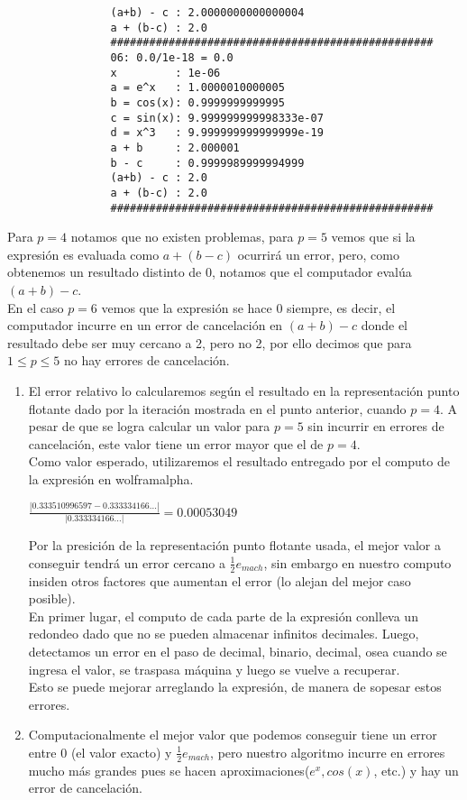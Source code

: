\documentclass[spanish, fleqn]{article}
\begin{document}
\begin{enumerate}
\begin{verbatim}
				(a+b) - c : 2.0000000000000004
				a + (b-c) : 2.0
				##################################################
				06: 0.0/1e-18 = 0.0
				x         : 1e-06
				a = e^x   : 1.0000010000005
				b = cos(x): 0.9999999999995
				c = sin(x): 9.999999999998333e-07
				d = x^3   : 9.999999999999999e-19
				a + b     : 2.000001
				b - c     : 0.9999989999994999
				(a+b) - c : 2.0
				a + (b-c) : 2.0
				##################################################
			\end{verbatim}
			Para $p=4$ notamos que no existen problemas, para $p=5$ vemos que
			si la expresión es evaluada como $a + (b - c)$ ocurrirá un error, 
			pero, como obtenemos un resultado distinto de 0, notamos que el
			computador evalúa $(a + b) - c$.\\
			En el caso $p=6$ vemos que la expresión se hace 0 siempre, es decir,
			el computador incurre en un error de cancelación en $(a+b)-c$ donde
			el resultado debe ser muy cercano a 2, pero no 2, por ello decimos
			que para $1 \leq p \leq 5$ no hay errores de cancelación. 

		\begin{enumerate}
			\item
				El error relativo lo calcularemos según el resultado en la
				representación punto flotante dado por la iteración mostrada en
				el punto anterior, cuando $p = 4$. A pesar de que se 
				logra calcular un valor para $p = 5$ sin incurrir en errores de
				cancelación, este valor tiene un error mayor que el de $p=4$.\\
				Como valor esperado, utilizaremos el resultado entregado por el 
				computo de la expresión en wolframalpha.
				\begin{center}
					$\frac{|0.333510996597 - 0.333334166...|}{|0.333334166...|}
					= 0.00053049$
				\end{center}
				Por la presición de la representación punto flotante usada, el 
				mejor valor a conseguir tendrá un error cercano a $\frac{1}{2} 
				e_{mach}$, sin embargo en nuestro computo insiden otros 
				factores que aumentan el error (lo alejan del mejor caso 
				posible).\\
				En primer lugar, el computo de cada parte de la expresión 
				conlleva un redondeo dado que no se pueden almacenar infinitos
				decimales. Luego, detectamos un error en el paso de decimal, 
				binario, decimal, osea cuando se ingresa el valor, se traspasa 
				máquina y luego se vuelve a recuperar.\\
				Esto se puede mejorar arreglando la expresión, de manera de 
				sopesar estos errores.
			\item
				Computacionalmente el mejor valor que podemos conseguir tiene un 
				error entre 0 (el valor exacto) y $\frac{1}{2} e_{mach}$, pero 
				nuestro algoritmo incurre en errores mucho más grandes pues se
				hacen aproximaciones($e^x, cos(x)$, etc.) y hay un error de 
				cancelación.
		\end{enumerate}
	\end{enumerate}
\end{document}
